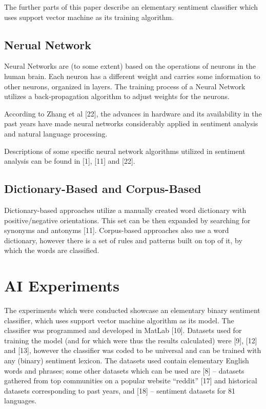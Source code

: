 \documentclass[12pt,journal,compsoc]{IEEEtran}
\begin{document}
The further parts of this paper describe an elementary sentiment classifier which uses support vector machine as its training algorithm.

\subsection{Nerual Network}
Neural Networks are (to some extent) based on the operations of neurons in the human brain. Each neuron has a different weight and carries some information to other neurons, organized in layers. The training process of a Neural Network utilizes a back-propagation algorithm to adjust weights for the neurons.

According to Zhang et al [22], the advances in hardware and its availability in the past years have made neural networks considerably applied in sentiment analysis and natural language processing.

Descriptions of some specific neural network algorithms utilized in sentiment analysis can be found in [1], [11] and [22].

\subsection{Dictionary-Based and Corpus-Based}
Dictionary-based approaches utilize a manually created word dictionary with positive/negative orientations. This set can be then expanded by searching for synonyms and antonyms [11]. Corpus-based approaches also use a word dictionary, however there is a set of rules and patterns built on top of it, by which the words are classified.

\section{AI Experiments}
The experiments which were conducted showcase an elementary binary sentiment classifier, which uses support vector machine algorithm as its model. The classifier was programmed and developed in MatLab [10]. Datasets used for training the model (and for which were thus the results calculated) were [9], [12] and [13], however the classifier was coded to be universal and can be trained with any (binary) sentiment lexicon. The datasets used contain elementary English words and phrases; some other datasets which can be used are [8] – datasets gathered from top communities on a popular website “reddit” [17] and historical datasets corresponding to past years, and [18] – sentiment datasets for 81 languages.
\end{document}
